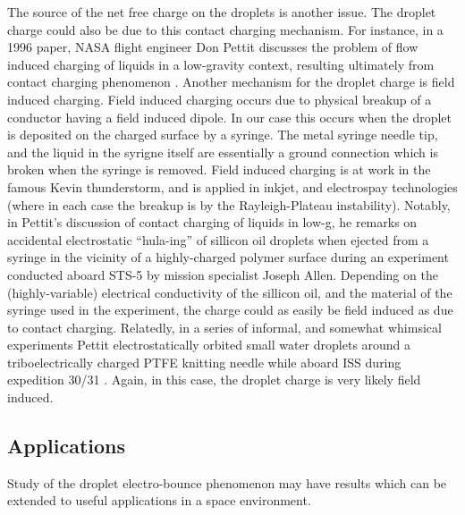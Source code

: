 \documentclass[10pt,a4paper]{article}
\begin{document}
The source of the net free charge on the droplets is another issue. The droplet charge could also be due to this contact charging mechanism. For instance, in a 1996 paper, NASA flight engineer Don Pettit discusses the problem of flow induced charging of liquids in a low-gravity context, resulting ultimately from contact charging phenomenon \cite{pettit_donald_flow_????}. Another mechanism for the droplet charge is field induced charging. Field induced charging occurs due to physical breakup of a conductor having a field induced dipole. In our case this occurs when the droplet is deposited on the charged surface by a syringe. The metal syringe needle tip, and the liquid in the syrigne itself are essentially a ground connection which is broken when the syringe is removed. Field induced charging is at work in the famous Kevin thunderstorm, and is applied in inkjet, and electrospay technologies (where in each case the breakup is by the Rayleigh-Plateau instability). Notably, in Pettit's discussion of contact charging of liquids in low-g, he remarks on accidental electrostatic ``hula-ing'' of sillicon oil droplets when ejected from a syringe in the vicinity of a highly-charged polymer surface during an experiment conducted aboard STS-5 by mission specialist Joseph Allen. Depending on the (highly-variable) electrical conductivity of the sillicon oil, and the material of the syringe used in the experiment, the charge could as easily be field induced as due to contact charging. Relatedly, in a series of informal, and somewhat whimsical experiments Pettit electrostatically orbited small water droplets around a triboelectrically charged PTFE knitting needle while aboard ISS during expedition 30/31 \cite{stevenson_electrostatic_2015}. Again, in this case, the droplet charge is very likely field induced.  

\subsection{Applications}
Study of the droplet electro-bounce phenomenon may have results which can be extended to useful applications in a space environment.
\end{document}
